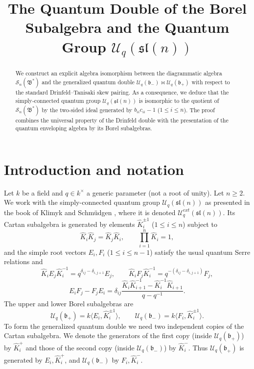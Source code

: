 \documentclass{article}
\theoremstyle{definition}
\newcommand{\Uc}{\mathcal{U}}
\newcommand{\bcS}{\mathcal{S}}
\newcommand{\fB}{\mathfrak{B}}
\newcommand{\fb}{\mathfrak{b}}
\newcommand{\sl}{\mathfrak{sl}}
\newcommand{\bipr}{\bowtie}
\begin{document}
\title{The Quantum Double of the Borel Subalgebra and the Quantum Group $\Uc_q(\sl(n))$}
\author{}
\date{}
\maketitle

\begin{abstract}
We construct an explicit algebra isomorphism between the diagrammatic algebra $\bcS_n(\fB^*)$ and the generalized quantum double $\Uc_q(\fb_-)\bipr \Uc_q(\fb_+)$ with respect to the standard Drinfeld--Tanisaki skew pairing. As a consequence, we deduce that the simply-connected quantum group $\Uc_q(\sl(n))$ is isomorphic to the quotient of $\bcS_n(\fB^*)$ by the two-sided ideal generated by $b_{ii}c_{ii}-1$ ($1\le i\le n$). The proof combines the universal property of the Drinfeld double with the presentation of the quantum enveloping algebra by its Borel subalgebras.
\end{abstract}

\section{Introduction and notation}

Let $k$ be a field and $q\in k^\times$ a generic parameter (not a root of unity). Let $n\ge 2$. We work with the simply-connected quantum group $\Uc_q(\sl(n))$ as presented in the book of Klimyk and Schm\"udgen \cite{KlimykSchmudgen}, where it is denoted $\Uc_q^{ext}(\sl(n))$. Its Cartan subalgebra is generated by elements $\hat K_i^{\pm1}$ ($1\le i\le n$) subject to
\begin{equation}\label{eq:cartan}
\hat K_i\hat K_j=\hat K_j\hat K_i,\qquad \prod_{i=1}^n \hat K_i=1,
\end{equation}
and the simple root vectors $E_i,F_i$ ($1\le i\le n-1$) satisfy the usual quantum Serre relations and
\begin{equation}\label{eq:action}
\hat K_i E_j \hat K_i^{-1}=q^{\delta_{ij}-\delta_{i,j+1}}E_j,\qquad
\hat K_i F_j \hat K_i^{-1}=q^{-(\delta_{ij}-\delta_{i,j+1})}F_j,
\end{equation}
\begin{equation}\label{eq:EF}
E_i F_j - F_j E_i = \delta_{ij}\frac{\hat K_i \hat K_{i+1}^{-1} - \hat K_i^{-1}\hat K_{i+1}}{q-q^{-1}}.
\end{equation}
The upper and lower Borel subalgebras are
\[
\Uc_q(\fb_+)=k\langle E_i,\hat K_i^{\pm1}\rangle,\qquad
\Uc_q(\fb_-)=k\langle F_i,\hat K_i^{\pm1}\rangle.
\]
To form the generalized quantum double we need two independent copies of the Cartan subalgebra. We denote the generators of the first copy (inside $\Uc_q(\fb_+)$) by $\hat K_i^+$ and those of the second copy (inside $\Uc_q(\fb_-)$) by $\hat K_i^-$. Thus $\Uc_q(\fb_+)$ is generated by $E_i,\hat K_i^+$, and $\Uc_q(\fb_-)$ by $F_i,\hat K_i^-$.
\end{document}
